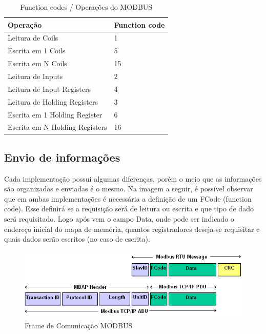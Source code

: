 \begin{table}[]
\centering
\caption{Function codes / Operações do MODBUS}
\label{modbus-funccodes}
\begin{tabular}{@{}ll@{}}
\toprule
\textbf{Operação}              & \textbf{Function code} \\ \midrule
Leitura de Coils               & 1                      \\
Escrita em 1 Coils             & 5                      \\
Escrita em N Coils             & 15                     \\
Leitura de Inputs              & 2                      \\
Leitura de Input Registers     & 4                      \\
Leitura de Holding Registers   & 3                      \\
Escrita em 1 Holding Register  & 6                      \\
Escrita em N Holding Registers & 16                     \\ \bottomrule
\end{tabular}
\end{table}

\subsection{Envio de informações}

Cada implementação possui algumas diferenças, porém o meio que as informações são organizadas e enviadas é o mesmo. Na imagem a seguir, é possível observar que em ambas implementações é necessária a definição de um FCode (function code). Esse definirá se a requisição será de leitura ou escrita e que tipo de dado será requisitado. Logo após vem o campo Data, onde pode ser indicado o endereço inicial do mapa de memória, quantos registradores deseja-se requisitar e quais dados serão escritos (no caso de escrita).

\begin{figure}[H]
        \begin{center}
                \includegraphics[width=\textwidth,natwidth=585,natheight=180]{assets/images/modbus-frame.png}
                \caption{Frame de Comunicação MODBUS}
                \label{fig:modbus-frame}
        \end{center}
\end{figure}


